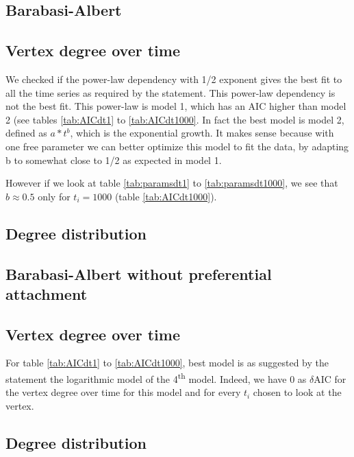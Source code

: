 \documentclass{article}
\begin{document}
\subsection{Barabasi-Albert}


\subsection{Vertex degree over time}

We checked if the power-law dependency with 1/2 exponent gives the best fit to
all the time series as required by the statement. This power-law dependency is
not the best fit. This power-law is model 1, which has an AIC higher than model
2 (see tables \ref{tab:AICdt1} to \ref{tab:AICdt1000}. In fact the best model is
model 2, defined as \textbf{$a*{t^b}$}, which is the exponential growth. It
makes sense because with one free parameter we can better optimize this model to
fit the data, by adapting b to somewhat close to 1/2 as expected in model 1.

However if we look at table \ref{tab:paramsdt1} to \ref{tab:paramsdt1000}, we
see that $b \approx 0.5$ only for $t_i = 1000$ (table \ref{tab:AICdt1000}).

\subsection{Degree distribution}

\subsection{Barabasi-Albert without preferential attachment}

\subsection{Vertex degree over time}

For table \ref{tab:AICdt1} to \ref{tab:AICdt1000}, best model is as suggested by
the statement the logarithmic model of the 4\textsuperscript{th} model. Indeed,
we have 0 as $\delta$AIC for the vertex degree over time for this model and for every
$t_i$ chosen to look at the vertex.


\subsection{Degree distribution}
\end{document}
